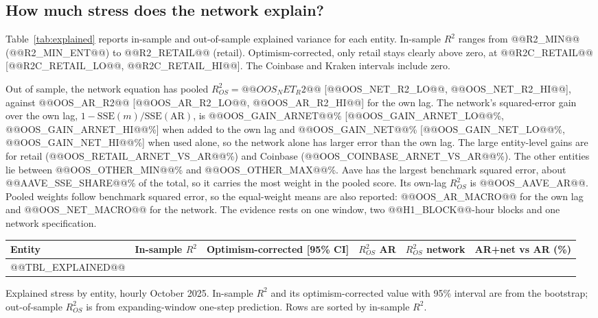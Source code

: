 \documentclass[referee,pdflatex,sn-mathphys-ay]{sn-jnl}
\newcommand{\fitbox}{\ifdim\wd\tabbox>\linewidth\resizebox{\linewidth}{!}{\usebox{\tabbox}}\else\usebox{\tabbox}\fi}%
\theoremstyle{thmstyleone}%
\theoremstyle{thmstyletwo}%
\theoremstyle{thmstylethree}%
\begin{document}
\subsection{How much stress does the network explain?}
\label{subsec:explained}
Table~\ref{tab:explained} reports in-sample and out-of-sample explained variance for each entity. In-sample $R^2$
ranges from @@R2_MIN@@ (@@R2_MIN_ENT@@) to @@R2_RETAIL@@ (retail). Optimism-corrected, only retail
stays clearly above zero, at @@R2C_RETAIL@@ [@@R2C_RETAIL_LO@@, @@R2C_RETAIL_HI@@]. The Coinbase and Kraken intervals include
zero.

Out of sample, the network equation has pooled $R^2_{OS}=@@OOS_NET_R2@@$ [@@OOS_NET_R2_LO@@, @@OOS_NET_R2_HI@@], against
@@OOS_AR_R2@@ [@@OOS_AR_R2_LO@@, @@OOS_AR_R2_HI@@] for the own lag. The network's squared-error gain over the own lag, $1-\mathrm{SSE}(m)/\mathrm{SSE}(\mathrm{AR})$, is @@OOS_GAIN_ARNET@@\% [@@OOS_GAIN_ARNET_LO@@\%, @@OOS_GAIN_ARNET_HI@@\%] when added to the own lag and
@@OOS_GAIN_NET@@\% [@@OOS_GAIN_NET_LO@@\%, @@OOS_GAIN_NET_HI@@\%] when used alone, so the network alone has larger error than the own lag. The large entity-level gains are for retail
(@@OOS_RETAIL_ARNET_VS_AR@@\%) and Coinbase (@@OOS_COINBASE_ARNET_VS_AR@@\%). The other entities lie between
@@OOS_OTHER_MIN@@\% and @@OOS_OTHER_MAX@@\%. Aave has the largest benchmark squared error, about @@AAVE_SSE_SHARE@@\% of
the total, so it carries the most weight in the pooled score. Its own-lag $R^2_{OS}$ is @@OOS_AAVE_AR@@. Pooled weights
follow benchmark squared error, so the equal-weight means are also reported: @@OOS_AR_MACRO@@ for the own lag and
@@OOS_NET_MACRO@@ for the network. The evidence rests on one window, two @@H1_BLOCK@@-hour blocks and one network specification.

\begin{lrbox}{\tabbox}\footnotesize\setlength{\tabcolsep}{3pt}%
\begin{tabular}{@{}lccccc@{}}
\toprule
\textbf{Entity} & \textbf{In-sample $R^2$} & \textbf{Optimism-corrected [95\% CI]} & \textbf{$R^2_{OS}$ AR} & \textbf{$R^2_{OS}$ network} & \textbf{AR+net vs AR (\%)}\\
\midrule
@@TBL_EXPLAINED@@
\bottomrule
\end{tabular}
\end{lrbox}
\begin{tableorg}[tbp]
\centering
\caption{Explained stress by entity, hourly October 2025. In-sample $R^2$ and its optimism-corrected value
with 95\% interval are from the bootstrap; out-of-sample $R^2_{OS}$ is from expanding-window one-step prediction.
Rows are sorted by in-sample $R^2$.}
\label{tab:explained}
\fitbox
\end{tableorg}
\end{document}
